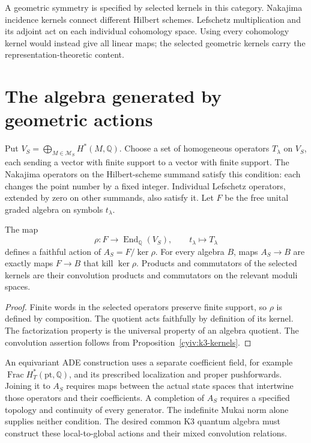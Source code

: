 A geometric symmetry is specified by selected kernels in this category.
Nakajima incidence kernels connect different Hilbert schemes.
Lefschetz multiplication and its adjoint act on each individual
cohomology space.
Using every cohomology kernel would instead give all linear maps;
the selected geometric kernels carry the representation-theoretic content.

\section{The algebra generated by geometric actions}
Put $V_S=\bigoplus_{M\in\mathscr M_S}H^*(M,\mathbb Q)$.
Choose a set of homogeneous operators $T_\lambda$ on $V_S$, each sending
a vector with finite support to a vector with finite support.
The Nakajima operators on the Hilbert-scheme summand satisfy this
condition: each changes the point number by a fixed integer.
Individual Lefschetz operators, extended by zero on other summands,
also satisfy it.
Let $F$ be the free unital graded algebra on symbols $t_\lambda$.

\begin{proposition}\label{cyiv:k3-action}
The map
\[
 \rho:F\longrightarrow\operatorname{End}_{\mathbb Q}(V_S),
 \qquad t_\lambda\longmapsto T_\lambda
\]
defines a faithful action of $A_S=F/\ker\rho$.
For every algebra $B$, maps $A_S\to B$ are exactly maps $F\to B$
that kill $\ker\rho$.
Products and commutators of the selected kernels are their convolution
products and commutators on the relevant moduli spaces.
\end{proposition}
\begin{proof}
Finite words in the selected operators preserve finite support, so
$\rho$ is defined by composition.
The quotient acts faithfully by definition of its kernel.
The factorization property is the universal property of an algebra
quotient.
The convolution assertion follows from Proposition~\ref{cyiv:k3-kernels}.
\end{proof}

An equivariant ADE construction uses a separate coefficient field,
for example $\operatorname{Frac}H_T^*(\mathrm{pt},\mathbb Q)$,
and its prescribed localization and proper pushforwards.
Joining it to $A_S$ requires maps between the actual state spaces that
intertwine those operators and their coefficients.
A completion of $A_S$ requires a specified topology and continuity of
every generator.
The indefinite Mukai norm alone supplies neither condition.
The desired common K3 quantum algebra must construct these local-to-global
actions and their mixed convolution relations.

